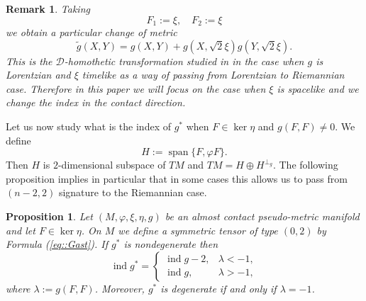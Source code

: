 \documentclass[12pt,a4paper,final]{amsart}
\numberwithin{equation}{section}
\newtheorem{stw}[tw]{Proposition}
\newtheorem{uw}[tw]{Remark}
\theoremstyle{df}
\newcommand{\ind}{\operatorname{ind}}
\begin{document}
\begin{uw}
Taking $$
F_1:=\xi,\quad F_2:=\xi
$$ we obtain a particular change of metric
$$
\tilde{g}(X,Y)=g(X,Y)+g(X,\sqrt{2}\xi)g(Y,\sqrt{2}\xi).
$$
This is the \(\mathcal{D}\)-homothetic transformation studied in \cite{Calvaruso} in the case when $g$ is Lorentzian and $\xi$ timelike as a way of passing from Lorentzian to Riemannian case. Therefore in this paper we will focus on the case when $\xi$ is spacelike and we change the index in the contact direction.


\end{uw}

Let us now study what is the index of $g^\ast$ when $F\in\ker\eta$ and $g(F,F)\neq 0$. We define $$
H:=\operatorname{span} \{F,\varphi F\}
.$$ 
Then $H$
is $2$-dimensional subspace of $TM$ and
$
TM=H\oplus H^{\perp_g}
.$ The following proposition implies in particular that in some cases this allows us to pass from $(n-2,2)$ signature to the Riemannian case.
\begin{stw}
\label{lem::indeks:gstar}
Let $(M,\varphi,\xi,\eta,g)$ be an almost contact pseudo-metric manifold and let $F\in\ker\eta$. On $M$ we define a symmetric tensor of type $(0,2)$ by Formula (\ref{eq::Gast}).
If $g^\ast$ is nondegenerate then
\begin{equation}\label{eq::indeks:gstar}
\ind g^\ast=
\begin{cases}
\ind g-2,& \lambda<-1,\\
\ind g,& \lambda>-1,
\end{cases}
\end{equation}
where $\lambda:=g(F,F)$.
Moreover, $g^\ast$ is degenerate if and only if $\lambda=-1$.
\end{stw}
\end{document}
